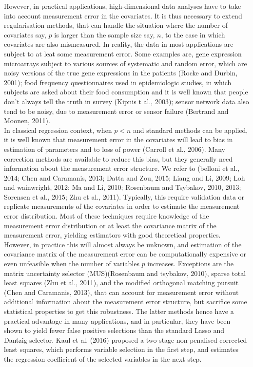 \documentclass[a4paper,12pt,openany]{report}
\theoremstyle{plain}
\theoremstyle{plain}
\theoremstyle{plain}
\theoremstyle{plain}
\theoremstyle{plain}
\theoremstyle{plain}
\theoremstyle{plain}
\theoremstyle{plain}
\theoremstyle{plain}
\theoremstyle{plain}
\theoremstyle{plain}
\theoremstyle{plain}
\begin{document}
However, in practical applications, high-dimensional data analyses have to take into account measurement error in the covariates. It is thus necessary to extend regularisation methods, that can handle the situation where the number of covariates say, $p$ is larger than the sample size say, $n$, to the case in which covariates are also mismeasured. In reality, the data in most applications are subject to at leat some measurement error. Some examples are, gene expression microarrays subject to various sources of systematic and random error, which are noisy versions of the true gene expressions in the patients (Rocke and Durbin, 2001); food frequency questionnaires used in epidemiologic studies, in which subjects are asked about their food consumption and it is well known that people don't always tell the truth in survey (Kipnis t al., 2003); sensor network data also tend to be noisy, due to measurement error or sensor failure (Bertrand and Moonen, 2011).\\

In classical regression context, when $p<n$ and standard methods can be applied, it is well known that measurement error in the covariates will lead to bias in estimation of parameters and to loss of power (Carroll et al., 2006). Many correction methods are available to reduce this bias, but they generally need information about the measurement error structure. We refer to (belloni et al., 2014; Chen and Caramanis, 2013; Datta and Zou, 2015; Liang and Li, 2009; Loh and wainwright, 2012; Ma and Li, 2010; Rosenbaum and Tsybakov, 2010, 2013; Sorensen et al., 2015; Zhu et al., 2011). Typically, this require validation data or replicate measurements of the covariates in order to estimate the measurement error distribution. Most of these techniques require knowledge of the measurement error distribution or at least the covariance matrix of the measurement error, yielding estimators with good theoretical properties. However, in practice this will almost always be unknown, and estimation of the covariance matrix of the measurement error can be computationally expensive or even unfeasible when the number of variables $p$ increases. Exceptions are the matrix uncertainty selector (MUS)(Rosenbaum and tsybakov, 2010), sparse total least squares (Zhu et al., 2011), and the modified orthogonal matching pursuit (Chen and Caramanis, 2013), that can account for measurement error without additional information about the measurement error structure, but sacrifice some statistical properties to get this robustness. The latter methods hence have a practical advantage in many applications, and in particular, they have been shown to yield fewer false positive selections than the standard Lasso and Dantzig selector. Kaul et al. (2016) proposed a two-stage non-penalised corrected least squares, which performs variable selection in the first step, and estimates the regression coefficient of the selected variables in the next step.\\
\end{document}
